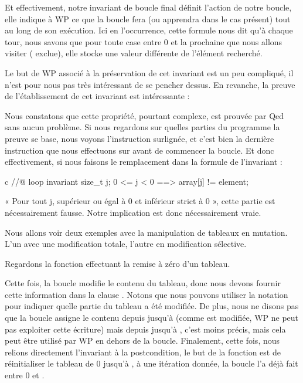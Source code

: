 

Et effectivement, notre invariant de boucle final définit l'action de notre
boucle, elle indique à WP ce que la boucle fera (ou apprendra dans le cas
présent) tout au long de son exécution. Ici en l'occurrence, cette formule nous
dit qu'à chaque tour, nous savons que pour toute case entre 0 et la prochaine
que nous allons visiter ( exclue), elle stocke une valeur
différente de l'élément recherché.


Le but de WP associé à la préservation de cet invariant est un peu compliqué, il
n'est pour nous pas très intéressant de se pencher dessus. En revanche, la
preuve de l'établissement de cet invariant est intéressante :




Nous constatons que cette propriété, pourtant complexe, est prouvée par
Qed sans aucun problème. Si nous regardons sur quelles parties du programme la
preuve se base, nous voyons l'instruction  surlignée, et c'est
bien la dernière instruction que nous effectuons sur  avant de commencer
la boucle. Et donc effectivement, si nous faisons le remplacement dans la formule
de l'invariant :


\begin{CodeBlock}{c}
//@ loop invariant \forall size_t j; 0 <= j < 0 ==> array[j] != element;
\end{CodeBlock}


« Pour tout j, supérieur ou égal à 0 et inférieur strict à 0 », cette partie est
nécessairement fausse. Notre implication est donc nécessairement vraie.




Nous allons voir deux exemples avec la manipulation de tableaux en mutation.
L'un avec une modification totale, l'autre en modification sélective.





Regardons la fonction effectuant la remise à zéro d'un tableau.





Cette fois, la boucle modifie le contenu du tableau, donc nous devons fournir
cette information dans la clause . Notons que nous
pouvons utiliser la notation  pour indiquer quelle partie du
tableau a été modifiée. De plus, nous ne disons pas que la boucle assigne le
contenu depuis  jusqu'à  (comme 
est modifiée, WP ne peut pas exploiter cette écriture) mais depuis 
jusqu'à , c'est moins précis, mais cela peut être utilisé
par WP en dehors de la boucle. Finalement, cette fois, nous relions directement
l'invariant à la postcondition, le but de la fonction est de réinitialiser le
tableau de 0 jusqu'à , à une itération donnée, la boucle l'a
déjà fait entre 0 et .


